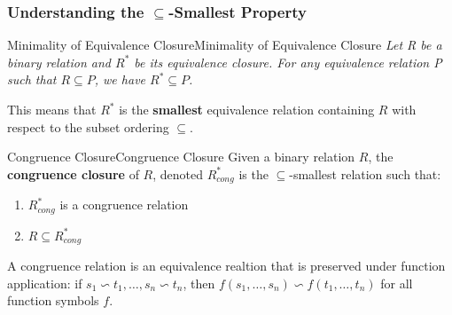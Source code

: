 \documentclass[a4paper]{article}
\theoremstyle{definition}
\begin{document}
\subsubsection{Understanding the \( \subseteq \)-Smallest Property}
\begin{definition}{Minimality of Equivalence Closure}{Minimality of Equivalence Closure}
\textit{Let R be a binary relation and \( R^* \) be its equivalence closure. For any equivalence relation P such that
\( R \subseteq P \), we have \( R^* \subseteq P \).}
\end{definition}
This means that \( R^* \) is the \textbf{smallest} equivalence relation containing \( R \) with respect to the subset ordering \( \subseteq \).
\begin{definition}{Congruence Closure}{Congruence Closure}
Given a binary relation \( R \), the \textbf{congruence closure} of \( R \), denoted \( R_{cong}^{*} \) is the 
\( \subseteq \)-smallest relation such that:
\begin{enumerate}
	\item \( R_{cong}^{*} \) is a congruence relation 
	\item \( R \subseteq R_{cong}^{*} \)
\end{enumerate}
\end{definition}
A congruence relation is an equivalence realtion that is preserved under function application: if 
\( s_1 \backsim t_1, \ldots, s_n \backsim t_n \), then \( f(s_1, \ldots, s_n) \backsim f(t_1, \ldots, t_n) \) for all function 
symbols \( f \).
\end{document}
